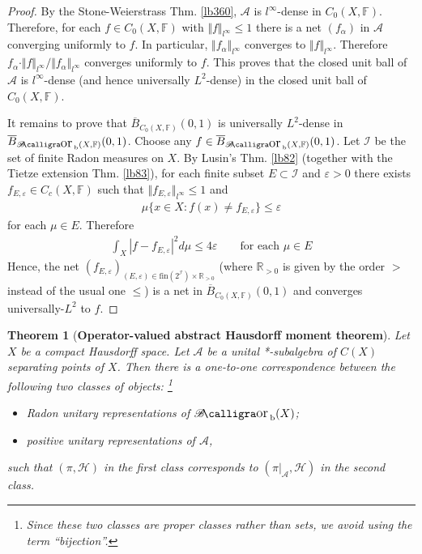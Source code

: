 \documentclass[12pt,b5paper,notitlepage]{article}
\theoremstyle{definition}
\theoremstyle{plain}
\newtheorem{thm}[df]{Theorem}
\DeclareMathOperator{\Borb}{{\mathscr{B}\text{\kern -2pt {\calligra\large or}}\,}_{\mathrm b}}
\newcommand{\ovl}{\overline}
\newcommand{\scr}{\mathscr}
\newcommand{\Rbb}{\mathbb R}
\newcommand{\fin}{\mathrm{fin}}
\newcommand{\Fbb}{\mathbb F}
\newcommand{\eps}{\varepsilon}
\newcommand{\MH}{\mathcal H}
\numberwithin{equation}{section}
\begin{document}
\begin{proof}
By the Stone-Weierstrass Thm. \ref{lb360}, $\scr A$ is $l^\infty$-dense in $C_0(X,\Fbb)$. Therefore, for each $f\in C_0(X,\Fbb)$ with $\Vert f\Vert_{l^\infty}\leq 1$ there is a net $(f_\alpha)$ in $\scr A$ converging uniformly to $f$. In particular, $\Vert f_\alpha\Vert_{l^\infty}$ converges to $\Vert f\Vert_{l^\infty}$. Therefore $f_\alpha\cdot \Vert f\Vert_{l^\infty}/\Vert f_\alpha\Vert_{l^\infty}$ converges uniformly to $f$. This proves that the closed unit ball of $\scr A$ is $l^\infty$-dense (and hence universally $L^2$-dense) in the closed unit ball of $C_0(X,\Fbb)$.

It remains to prove that $\ovl B_{C_0(X,\Fbb)}(0,1)$ is universally $L^2$-dense in $\ovl B_{\Borb(X,\Fbb)}(0,1)$. Choose any $f\in \ovl B_{\Borb(X,\Fbb)}(0,1)$. Let $\scr I$ be the set of finite Radon measures on $X$. By Lusin's Thm. \ref{lb82} (together with the Tietze extension Thm. \ref{lb83}), for each finite subset $E\subset\scr I$ and $\eps>0$ there exists $f_{E,\eps}\in C_c(X,\Fbb)$ such that $\Vert f_{E,\eps}\Vert_{l^\infty}\leq 1$ and
\begin{align*}
\mu\{x\in X:f(x)\neq f_{E,\eps}\}\leq\eps
\end{align*}
for each $\mu\in E$. Therefore
\begin{align*}
\int_X|f-f_{E,\eps}|^2d\mu\leq 4\eps\qquad\text{for each }\mu\in E
\end{align*}
Hence, the net $(f_{E,\eps})_{(E,\eps)\in\fin(2^{\scr I})\times\Rbb_{>0}}$ (where $\Rbb_{>0}$ is given by the order $>$ instead of the usual one $\leq$) is a net in $\ovl B_{C_0(X,\Fbb)}(0,1)$ and converges universally-$L^2$ to $f$.
\end{proof}




\begin{thm}[\textbf{Operator-valued abstract Hausdorff moment theorem}]\label{lb274}
Let $X$ be a compact Hausdorff space. Let $\scr A$ be a unital *-subalgebra of $C(X)$ separating points of $X$. Then there is a one-to-one correspondence between the following two classes of objects: \footnote{Since these two classes are proper classes rather than sets, we avoid using the term ``bijection''.}
\begin{itemize}
\item[(1)] Radon unitary representations of $\Borb(X)$;
\item[(2)] positive unitary representations of $\scr A$,
\end{itemize}
such that $(\pi,\MH)$ in the first class corresponds to $(\pi|_{\scr A},\MH)$ in the second class.
\end{thm}
\end{document}
